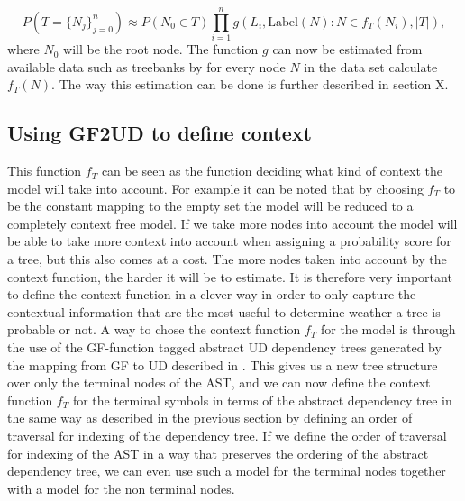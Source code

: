 \begin{equation*}
    P(T=\{N_j\}_{j=0}^n) \approx P(N_0\in T) \prod_{i=1}^{n}g(L_i, \text{Label} (N):N\in f_T(N_i), |T|),
\end{equation*}
where $N_0$ will be the root node. The function $g$ can now be estimated from available data such as treebanks by for every node $N$ in the data set calculate $f_T(N)$. The way this estimation can be done is further described in section X. 
\subsection{Using GF2UD to define context}
This function $f_T$ can be seen as the function deciding what kind of context the model will take into account. For example it can be noted that by choosing $f_T$ to be the constant mapping to the empty set the model will be reduced to a completely context free model. If we take more nodes into account the model will be able to take more context into account when assigning a probability score for a tree, but this also comes at a cost. The more nodes taken into account by the context function, the harder it will be to estimate. It is therefore very important to define the context function in a clever way in order to only capture the contextual information that are the most useful to determine weather a tree is probable or not.
A way to chose the context function $f_T$ for the model is through the use of the GF-function tagged abstract UD dependency trees generated by the mapping from GF to UD described in \citep{kolachina2016gf2ud}. This gives us a new tree structure over only the terminal nodes of the AST, and we can now define the context function $f_T$ for the terminal symbols in terms of the abstract dependency tree in the same way as described in the previous section by defining an order of traversal for indexing of the dependency tree. If we define the order of traversal for indexing of the AST in a way that preserves the ordering of the abstract dependency tree, we can even use such a model for the terminal nodes together with a model for the non terminal nodes.





